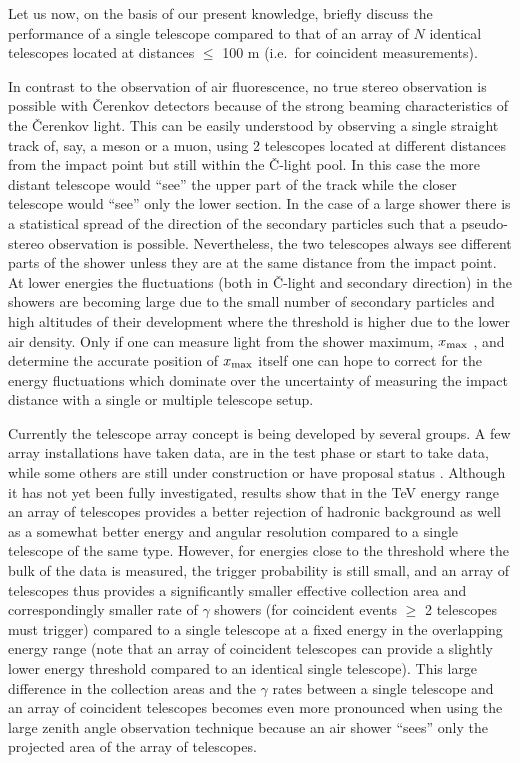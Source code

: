 Let us now, on the basis of our present  knowledge, briefly
discuss the performance
of a single telescope compared to that of an array of $N$ identical
telescopes located at distances $\leq$ 100 m
(i.e.\ for coincident
measurements).

In contrast to the observation of air fluorescence, no true stereo
observation is possible with \v{C}erenkov detectors because of the strong
beaming characteristics of the \v{C}erenkov light. 
This can be easily understood
by observing a single straight track of, say, a meson or a muon, using 2 telescopes
located at different distances from the impact point but still within the
\v{C}-light pool. In this case the more distant telescope would ``see'' the 
upper part of the track while the closer telescope would ``see'' only the
lower section. In the case of a
large shower there is a statistical spread  of the direction of the
secondary particles such that a pseudo-stereo observation is possible.
Nevertheless, the two telescopes always see different parts of the shower
unless they are at the  same distance from the impact point.
At lower
energies the fluctuations (both in \v{C}-light and  secondary direction) in the
showers
are becoming large due to the small number of
secondary particles and high altitudes of their development where the \Cerenkov
threshold is higher due to the lower air density.
Only if one can measure light from the shower
maximum, $x_{{\rm max}}$ ,  and determine the accurate
position of $x_{{\rm max}}$ itself one can hope to
correct for the energy fluctuations which dominate over the uncertainty of
measuring the impact distance with a single or multiple telescope setup. 

Currently the telescope array concept is being developed
by several groups.
A few array installations have taken data, are in the test phase or start to take
data, while some others are still under construction or have proposal status
\cite{aharonian:92,chadwick:94,kalekin:94,veritas:97,hess:97,krennrich:97a,teshima:97}.
Although it has not yet been fully investigated, results show 
that in
the TeV energy range an array of telescopes provides a better 
rejection of hadronic background 
as well as a somewhat better energy and angular resolution compared to a
single telescope of the same type.
However, for energies close to the threshold
where the bulk of the data is measured, 
the trigger probability is still small, and an array of telescopes thus provides
a significantly smaller effective collection area and correspondingly smaller
rate of $\gamma$ showers 
(for coincident events $\geq$ 2 telescopes must trigger) compared to a single
telescope at a fixed energy in the overlapping energy range  
(note that an array of coincident telescopes can
provide a slightly lower energy threshold compared to an identical 
single telescope). This large difference in the collection areas
and the $\gamma$ rates between a single telescope and an
array of coincident telescopes becomes even more pronounced
when using the large zenith angle observation technique
because an air shower ``sees'' only the projected area of the array 
of telescopes. 

